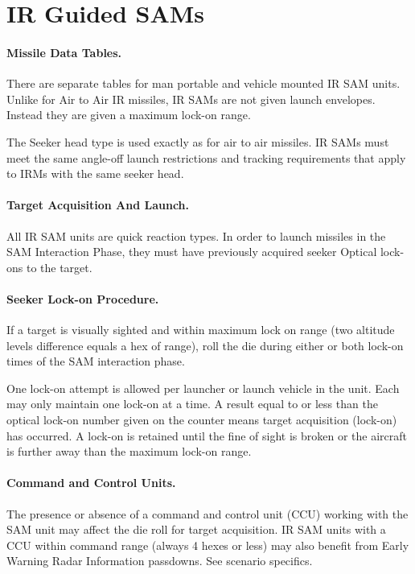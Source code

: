 \section{IR Guided SAMs}

\paragraph{Missile Data Tables.} There are separate tables for man portable and vehicle mounted IR SAM units. Unlike for Air to Air IR missiles, IR SAMs are not given launch envelopes. Instead they are given a maximum lock-on range.

The Seeker head type is used exactly as for air to air missiles. IR SAMs must meet the same angle-off launch restrictions and tracking requirements that apply to IRMs with the same seeker head.

\paragraph{Target Acquisition And Launch.} All IR SAM units are quick reaction types. In order to launch missiles in the SAM Interaction Phase, they must have previously acquired seeker Optical lock-ons to the target.

\paragraph{Seeker Lock-on Procedure.} 

If a target is visually sighted and within maximum lock on range (two altitude levels difference equals a hex of range), roll the die during either or both lock-on times of the SAM interaction phase.

One lock-on attempt is allowed per launcher or launch vehicle in the unit. Each may only maintain one lock-on at a time. A result equal to or less than the optical lock-on number given on the counter means target acquisition (lock-on) has occurred. A lock-on is retained until the fine of sight is broken or the aircraft is further away than the maximum lock-on range.

\paragraph{Command and Control Units.} The presence or absence of a command and control unit (CCU) working with the SAM unit may affect the die roll for target acquisition. IR SAM units with a CCU within command range (always 4 hexes or less) may also benefit from Early Warning Radar Information passdowns. See scenario specifics.

